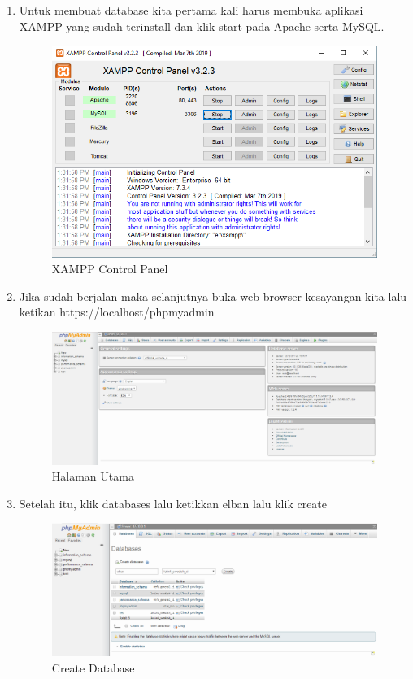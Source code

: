 \begin{enumerate}
\item Untuk membuat database kita pertama kali harus membuka aplikasi XAMPP yang sudah terinstall dan klik start pada Apache serta MySQL.

 \begin{figure}[h]
\centering
\includegraphics[scale=0.5]{figures/controlpanel}
\caption{XAMPP Control Panel}
\end{figure}

\item Jika sudah berjalan maka selanjutnya buka web browser kesayangan kita lalu ketikan https://localhost/phpmyadmin

 \begin{figure}[h]
\centering
\includegraphics[scale=0.35]{figures/phpmyadmin}
\caption{Halaman Utama}
\end{figure}

\item Setelah itu, klik databases lalu ketikkan elban lalu klik create

 \begin{figure}[h]
\centering
\includegraphics[scale=0.35]{figures/databases}
\caption{Create Database}
\end{figure}


\end{enumerate}
